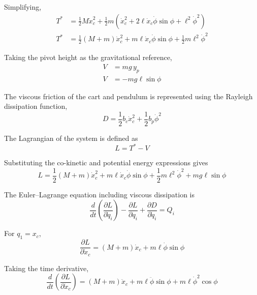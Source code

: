 \documentclass[11pt,a4paper]{article}
\begin{document}
Simplifying,
\begin{align*}
	T^{*} &= \frac{1}{2} M \dot{x}_{c}^{2}
	+ \frac{1}{2} m \left( \dot{x}_{c}^{2}
	+ 2 \ell \dot{x}_{c} \dot{\phi} \sin\phi + \ell^{2}\dot{\phi}^{2} \right) \\
	T^{*} &= \frac{1}{2} \left( M + m \right) \dot{x}_{c}^{2}
	+ m \ell \dot{x}_{c} \dot{\phi} \sin\phi
	+ \frac{1}{2} m \ell^{2} \dot{\phi}^{2}
\end{align*}

Taking the pivot height as the gravitational reference,
\begin{align*}
	V &= m g\, y_{p} \\
	V &= -m g \ell \sin\phi
\end{align*}

The viscous friction of the cart and pendulum is represented using the Rayleigh
dissipation function,
\begin{equation*}
	D = \frac{1}{2} b_{c} \dot{x}_{c}^{2} + \frac{1}{2} b_{p} \dot{\phi}^{2}
\end{equation*}

The Lagrangian of the system is defined as
\begin{equation*}
	L = T^{*} - V
\end{equation*}

Substituting the co-kinetic and potential energy expressions gives
\begin{equation*}
	L = \frac{1}{2} \left( M + m \right) \dot{x}_{c}^{2}
	+ m \ell \dot{x}_{c} \dot{\phi} \sin\phi
	+ \frac{1}{2} m \ell^{2} \dot{\phi}^{2}
	+ m g \ell \sin\phi
\end{equation*}

The Euler--Lagrange equation including viscous dissipation is
\begin{equation*}
	\frac{d}{dt} \left( \frac{\partial L}{\partial \dot{q}_{i}} \right)
	- \frac{\partial L}{\partial q_{i}}
	+ \frac{\partial D}{\partial \dot{q}_{i}} = Q_{i}
\end{equation*}

For $q_{1} = x_{c}$,
\begin{equation*}
	\frac{\partial L}{\partial \dot{x}_{c}}
	= \left( M + m \right) \dot{x}_{c} + m \ell \dot{\phi} \sin\phi
\end{equation*}

Taking the time derivative,
\begin{equation*}
	\frac{d}{dt} \left( \frac{\partial L}{\partial \dot{x}_{c}} \right)
	= \left( M + m \right) \ddot{x}_{c}
	+ m \ell \ddot{\phi} \sin\phi
	+ m \ell \dot{\phi}^{2} \cos\phi
\end{equation*}
\end{document}
